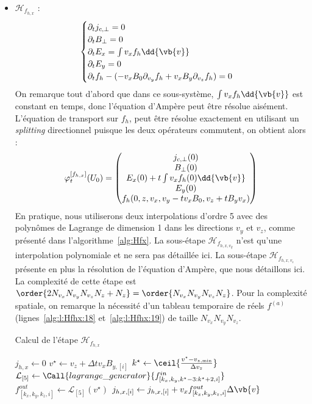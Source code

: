 \begin{itemize}
  \item $\mathcal{H}_{f_{h,x}}$ :
    $$
      \begin{cases}
        \partial_t j_{c,\perp} = 0 \\
        \partial_t B_{\perp} = 0 \\
        \partial_t E_{x} = \int v_xf_h\dd{\vb{v}} \\
        \partial_t E_{y} = 0 \\
        \partial_t f_h - (-v_xB_0\partial_{v_y}f_h + v_xB_y\partial_{v_z}f_h) = 0
      \end{cases}
    $$
    On remarque tout d'abord que dans ce sous-système, $\int v_xf_h\dd{\vb{v}}$ est constant en temps, donc l'équation d'Ampère peut être résolue aisément. L'équation de transport sur $f_h$, peut être résolue exactement en utilisant un \emph{splitting} directionnel puisque les deux opérateurs commutent, on obtient alors :
    $$
      \varphi_t^{[f_{h,x}]}(U_0) = \begin{pmatrix}
        j_{c,\perp}(0) \\
        B_{\perp}(0) \\
        E_x(0) + t\int v_xf_h(0)\dd{\vb{v}} \\
        E_y(0) \\
        f_h(0,z,v_x,v_y-tv_xB_0,v_z+tB_yv_x)
      \end{pmatrix}
    $$
    En pratique, nous utiliserons deux interpolations d'ordre 5 avec des polynômes de Lagrange de dimension 1 dans les directions $v_y$ et $v_z$, comme présenté dans l'algorithme~\ref{alg:Hfx}. La sous-étape $\mathcal{H}_{f_{h,x,v_y}}$ n'est qu'une interpolation polynomiale et ne sera pas détaillée ici. La sous-étape $\mathcal{H}_{f_{h,x,v_z}}$ présente en plus la résolution de l'équation d'Ampère, que nous détaillons ici. La complexité de cette étape est $\order{2N_{v_x}N_{v_y}N_{v_z}N_z + N_z} = \order{N_{v_x}N_{v_y}N_{v_z}N_z}$. Pour la complexité spatiale, on remarque la nécessité d'un tableau temporaire de réels $f^{(a)}$ (lignes~\ref{alg:l:Hfhx:18} et~\ref{alg:l:Hfhx:19}) de taille $N_{v_x}N_{v_y}N_{v_z}$.
    \begin{algorithm}
      \caption{Calcul de l'étape $\mathcal{H}_{f_{h,x}}$}
      \label{alg:Hfx}
      \begin{algorithmic}[1]
          \State $j_{h,x} \gets 0$ 
          \ForAll{$(k_x,k_y,k_z)\in[\![0,N_{v_x}[\![\times[\![0,N_{v_y}[\![\times[\![0,N_{v_z}[\![$}
              \State $v^{\star} \gets v_z + \Delta t v_x B_{y,[i]}$
              \State $k^{\star} \gets \ceil{\frac{ v^{\star}-v_{z,\text{min}} }{ \Delta v_z }}$
              \State $\mathcal{L}_{[5]} \gets \Call{lagrange\_generator}{f^{in}_{[k_x,k_y,k^\star-3:k^\star+2,i]}}$
              \State $f^{out}_{[k_x,k_y,k_z,i]} \gets \mathcal{L}_{[5]}( v^{\star} )$
              \State $j_{h,x,[i]} \gets j_{h,x,[i]} + v_x f^{out}_{[k_x,k_y,k_z,i]} \Delta\vb{v}$
            \EndFor
          \EndFor


\end{algorithmic}
\end{algorithm}
\end{itemize}
